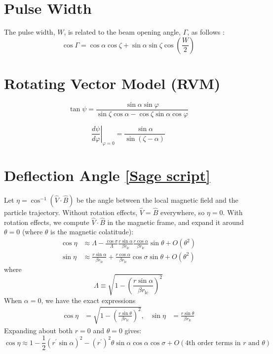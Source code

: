 \documentclass{book}
\newcommand{\phase}{\varphi}
\newcommand{\rL}{r_\text{lc}} %
\newcommand{\linktosage}[1]{\hyperref[#1]{[Sage script]}}
\begin{document}
\section{Pulse Width}

The pulse width, $W$, is related to the beam opening angle, $\Gamma$, as follows \citep{Lorimer2005}:
\begin{equation}
    \cos\Gamma = \cos\alpha\cos\zeta + \sin\alpha\sin\zeta\cos\left(\frac{W}{2}\right)
    \tag{H3.27}
\end{equation}

\section{Rotating Vector Model (RVM)}

\begin{equation}
    \tan{\psi} = \frac{\sin\alpha \sin\phase}{\sin\zeta\cos\alpha - \cos\zeta\sin\alpha\cos\phase}
\end{equation}

\begin{equation}
    \left.\frac{d\psi}{d\phase}\right|_{\phase=0} = \frac{\sin\alpha}{\sin(\zeta-\alpha)}
\end{equation}

\section{Deflection Angle \linktosage{sage:aberration_dip}}

Let $\eta = \cos^{-1}(\hat{V}\cdot\hat{B})$ be the angle between the local magnetic field and the particle trajectory.
Without rotation effects, $\hat{V} = \hat{B}$ everywhere, so $\eta = 0$.
With rotation effects, we compute $\hat{V}\cdot\hat{B}$ in the magnetic frame, and expand it around $\theta = 0$ (where $\theta$ is the magnetic colatitude):
\begin{equation}
    \begin{aligned}
        \cos\eta &\approx \Lambda - \frac{\cos\sigma}{\Lambda} \frac{r\sin\alpha}{\beta \rL} \frac{r\cos\alpha}{\beta \rL} \sin\theta +
                          O(\theta^2) \\
        \sin\eta &\approx \frac{r\sin\alpha}{\beta \rL} + \frac{r\cos\alpha}{\beta \rL}\cos\sigma\sin\theta +
                          O(\theta^2)
    \end{aligned}
\end{equation}
where
\begin{equation}
    \Lambda \equiv \sqrt{1-\left(\frac{r\sin\alpha}{\beta \rL}\right)^2}
\end{equation}
When $\alpha = 0$, we have the exact expressions
\begin{align}
    \cos\eta &= \sqrt{1-\left(\frac{r\sin\theta}{\beta \rL}\right)^2}, &
    \sin\eta &= \frac{r\sin\theta}{\beta \rL}
\end{align}
Expanding about both $r = 0$ and $\theta = 0$ gives:
\begin{equation}
    \cos\eta \approx 1 - \frac12(r^\prime\sin\alpha)^2 - (r^\prime)^2\theta\sin\alpha\cos\alpha\cos\sigma + O(\text{4th order terms in $r$ and $\theta$})
\end{equation}
\end{document}
